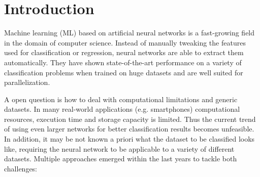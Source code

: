 \documentclass{article}
\begin{document}
\begin{abstract}
This documentation summarizes the progress of the automl{\textunderscore}freiburg video team on the AutoDL $2019-2020$ challenge. Two methods are presented: The first method relies on transfer learning of a single, pretrained video classification network which is fine tuned during the challenge. As this approach has shown several limitations if the test datasets vary too much, a more elaborate method based on meta learning is developed: Multiple classification networks are evaluated on different training datasets a priori and the incumbent for every dataset is stored in a lookup table. During test time, the similarity between the test dataset and all training datasets is measured and the incumbent of the most similar training dataset is used for training/evaluation on the test dataset. The first method has been submitted and evaluated on the AutoCV2 challenge and resulted in a mediocre score. Four different approaches are presented and evaluated for the second method, resulting in scores on par with the best performing image and video classification team.
\end{abstract}




\section{Introduction}
Machine learning (ML) based on artificial neural networks is a fast-growing field in the domain of computer science. Instead of manually tweaking the features used for classification or regression, neural networks are able to extract them automatically. They have shown state-of-the-art performance on a variety of classification problems when trained on huge datasets and are well suited for parallelization. 

A open question is how to deal with computational limitations and generic datasets. In many real-world applications (e.g. smartphones) computational resources, execution time and storage capacity is limited. Thus the current trend of using even larger networks for better classification results becomes unfeasible. In addition, it may be not known a priori what the dataset to be classified looks like, requiring the neural network to be applicable to a variety of different datasets. Multiple approaches emerged within the last years to tackle both challenges:
\end{document}
